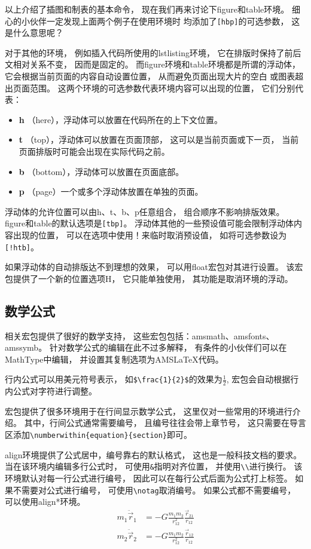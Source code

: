 \documentclass{ctexart}
\numberwithin{equation}{section}			%
\begin{document}
	以上介绍了插图和制表的基本命令，
	现在我们再来讨论下figure和table环境。
	细心的小伙伴一定发现上面两个例子在使用环境时
	均添加了\verb|[hbp]|的可选参数，
	这是什么意思呢？
	
	对于其他的环境，
	例如插入代码所使用的lstlisting环境，
	它在排版时保持了前后文相对关系不变，
	因而是固定的。
	而figure环境和table环境都是所谓的浮动体，
	它会根据当前页面的内容自动设置位置，
	从而避免页面出现大片的空白
	或图表超出页面范围。
	这两个环境的可选参数代表环境内容可以出现的位置，
	它们分别代表：
	
	\begin{itemize}
		\item \textbf{h} （here），浮动体可以放置在代码所在的上下文位置。
		\item \textbf{t} （top），浮动体可以放置在页面顶部，
			这可以是当前页面或下一页，
			当前页面排版时可能会出现在实际代码之前。
		\item \textbf{b} （bottom），浮动体可以放置在页面底部。
		\item \textbf{p} （page）一个或多个浮动体放置在单独的页面。
	\end{itemize}

	浮动体的允许位置可以由h、t、b、p任意组合，
	组合顺序不影响排版效果。
	figure和table的默认选项是\verb|[tbp]|。
	浮动体其他的一些预设值可能会限制浮动体内容出现的位置，
	可以在选项中使用！来临时取消预设值，
	如将可选参数设为\verb|[!htb]|。
	
	如果浮动体的自动排版达不到理想的效果，
	可以用float宏包对其进行设置。
	该宏包提供了一个新的位置选项H，
	它只能单独使用，
	其功能是取消环境的浮动。
	
	\subsection{数学公式}
	\AmS 相关宏包提供了很好的数学支持，
	这些宏包包括：amsmath、amsfonts、amssymb。
	针对数学公式的编辑在此不过多解释，
	有条件的小伙伴们可以在MathType中编辑，
	并设置其复制选项为AMSLaTeX代码。
	
	行内公式可以用美元符号表示，
	如\verb|$\frac{1}{2}$|的效果为$\frac{1}{2}$,
	\AmS 宏包会自动根据行内公式对字符进行调整。
	
	\AmS 宏包提供了很多环境用于在行间显示数学公式，
	这里仅对一些常用的环境进行介绍。
	其中，行间公式通常需要编号，
	且编号往往会带上章节号，
	这只需要在导言区添加\verb|\numberwithin{equation}{section}|即可。
	
	align环境提供了公式居中，编号靠右的默认格式，
	这也是一般科技文档的要求。
	当在该环境内编辑多行公式时，
	可使用\verb|&|指明对齐位置，
	并使用\verb|\\|进行换行。
	该环境默认对每一行公式进行编号，
	因此可以在每行公式后面为公式打上标签。
	如果不需要对公式进行编号，
	可使用\verb|\notag|取消编号。
	如果公式都不需要编号，
	可以使用align*环境。
	\begin{align}
		{m_1}{{\ddot \vec r}_1} &=  
			-G\frac{{{m_1}{m_2}}}{{r_{12}^2}}\frac{{{{\vec r}_{21}}}}
			{{{r_{12}}}} 	\label{eq:r1}  \\
		{m_2}{{\ddot \vec r}_2} &=  
			- G\frac{{{m_1}{m_2}}}{{r_{12}^2}}\frac{{{{\vec r}_{12}}}}
			{{{r_{12}}}} 	\label{eq:r2}
	\end{align}
	
\end{document}
